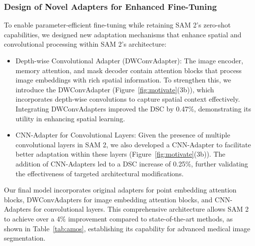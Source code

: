 \subsubsection{Design of Novel Adapters for Enhanced Fine-Tuning}
To enable parameter-efficient fine-tuning while retaining SAM 2's zero-shot capabilities, we designed new adaptation mechanisms that enhance spatial and convolutional processing within SAM 2’s architecture:
%
\begin{itemize}
\item Depth-wise Convolutional Adapter (DWConvAdapter): The image encoder, memory attention, and mask decoder contain attention blocks that process image embeddings with rich spatial information. To strengthen this, we introduce the DWConvAdapter (Figure~\ref{fig:motivate}(3b)), which incorporates depth-wise convolutions to capture spatial context effectively. Integrating DWConvAdapters improved the DSC by 0.47\%, demonstrating its utility in enhancing spatial learning.

\item CNN-Adapter for Convolutional Layers: Given the presence of multiple convolutional layers in SAM 2, we also developed a CNN-Adapter to facilitate better adaptation within these layers (Figure~\ref{fig:motivate}(3b)). The addition of CNN-Adapters led to a DSC increase of 0.25\%, further validating the effectiveness of targeted architectural modifications.
\end{itemize}

Our final model incorporates original adapters for point embedding attention blocks, DWConvAdapters for image embedding attention blocks, and CNN-Adapters for convolutional layers. This comprehensive architecture allows SAM 2 to achieve over a 4\% improvement compared to state-of-the-art methods, as shown in Table~\ref{tab:amos}, establishing its capability for advanced medical image segmentation.

